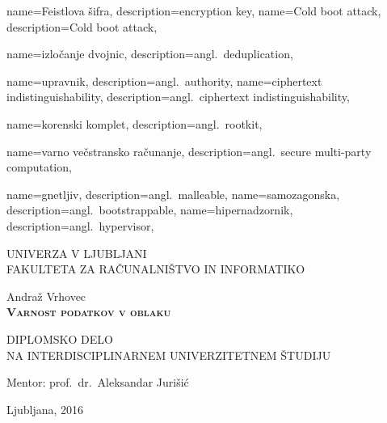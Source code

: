 \documentclass[12pt,a4paper,openany,tikz]{book}
\theoremstyle{plain}
\theoremstyle{definition}
\begin{document}
{
  name=Feistlova šifra,
  description={encryption key},
}
{
  name=Cold boot attack,
  description={Cold boot attack},
}

{
  name=izločanje dvojnic,
  description={angl.\ deduplication},
}

{
  name=upravnik,
  description={angl.\ authority},
}
{
  name=ciphertext indistinguishability,
  description={angl.\ ciphertext indistinguishability},
}

{
  name=korenski komplet,
  description={angl.\ rootkit},
}

{
  name=varno večstransko računanje,
  description={angl.\ secure multi-party computation},
}

{
  name=gnetljiv,
  description={angl.\ malleable},
}
{
  name=samozagonska,
  description={angl.\ bootstrappable},
}
{
  name=hipernadzornik,
  description={angl.\ hypervisor},
}


\begin{center}
{\large
UNIVERZA V LJUBLJANI\\
FAKULTETA ZA RAČUNALNIŠTVO IN INFORMATIKO\\
}

\vspace{3cm}
{\LARGE Andraž Vrhovec}\\

\vspace{2cm}
\textsc{\textbf{\LARGE
Varnost podatkov v oblaku
}}

\vspace{2cm}
{ DIPLOMSKO DELO}\\
{ NA INTERDISCIPLINARNEM UNIVERZITETNEM ŠTUDIJU
}


\vspace{2cm}
{\Large Mentor: prof.\ dr.\ Aleksandar Jurišić}

\vfill
{\Large Ljubljana, 2016}
\end{center}


\cleardoublepage
\end{document}
